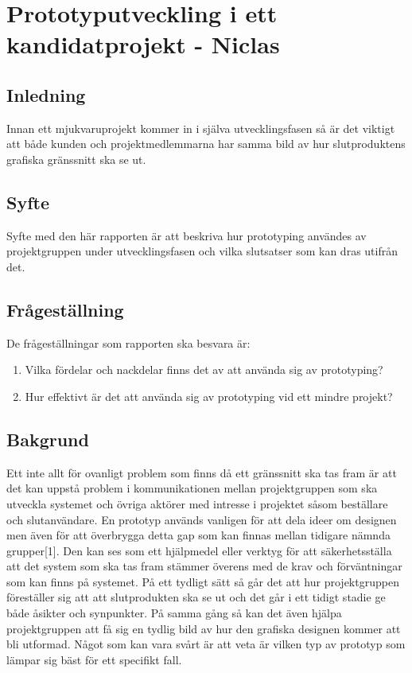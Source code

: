 \chapter{Prototyputveckling i ett kandidatprojekt - Niclas}
\section{Inledning}
Innan ett mjukvaruprojekt kommer in i själva utvecklingsfasen så är det viktigt att både kunden och projektmedlemmarna har samma bild av hur slutproduktens grafiska gränssnitt ska se ut. 

\section{Syfte}
Syfte med den här rapporten är att beskriva hur prototyping användes av projektgruppen under utvecklingsfasen och vilka slutsatser som kan dras utifrån det.   

\section{Frågeställning}
De frågeställningar som rapporten ska besvara är:
\begin{enumerate}
	\item Vilka fördelar och nackdelar finns det av att använda sig av prototyping?
	\item Hur effektivt är det att använda sig av prototyping vid ett mindre projekt?
\end{enumerate}

\section{Bakgrund}
Ett inte allt för ovanligt problem som finns då ett gränssnitt ska tas fram är att det kan uppstå problem i kommunikationen mellan projektgruppen som ska utveckla systemet och övriga aktörer med intresse i projektet såsom beställare och slutanvändare. En prototyp används vanligen för att dela ideer om designen men även för att överbrygga detta gap som kan finnas mellan tidigare nämnda grupper[1]. Den kan ses som ett hjälpmedel eller verktyg för att säkerhetsställa att det system som ska tas fram stämmer överens med de krav och förväntningar som kan finns på systemet. På ett tydligt sätt så går det att hur projektgruppen föreställer sig att att slutprodukten ska se ut och det går i ett tidigt stadie ge både åsikter och synpunkter. På samma gång så kan det även hjälpa projektgruppen att få sig en tydlig bild av hur den grafiska designen kommer att bli utformad. Något som kan vara svårt är att veta är vilken typ av prototyp som lämpar sig bäst för ett specifikt fall.

